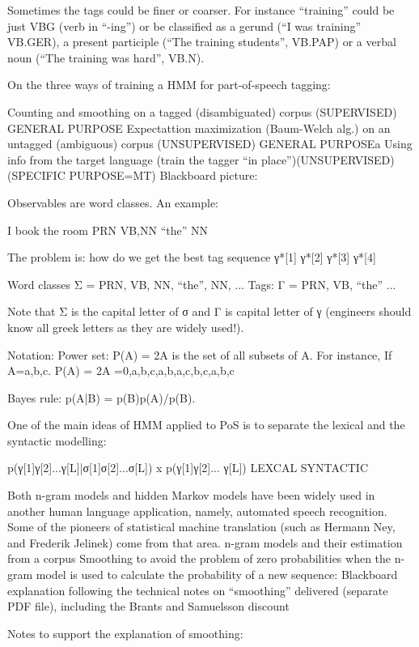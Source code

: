 Sometimes the tags could be finer or coarser. For instance “training” could be just VBG (verb in “-ing”) or be classified as a gerund (“I was training” VB.GER), a present participle (“The training students”, VB.PAP) or a verbal noun (“The training was hard”, VB.N).

On the three ways of training a HMM for part-of-speech tagging:

Counting and smoothing on a tagged (disambiguated) corpus (SUPERVISED) GENERAL PURPOSE
Expectattion maximization (Baum-Welch alg.) on an untagged (ambiguous) corpus (UNSUPERVISED) GENERAL PURPOSEa
Using info from the target language (train the tagger “in place”)(UNSUPERVISED) (SPECIFIC PURPOSE=MT)
Blackboard picture:


Observables are word classes. An example:

I book the room
{PRN} {VB,NN} “the” {NN}

The problem is: how do we get the best tag sequence γ*[1] γ*[2] γ*[3] γ*[4]

Word classes Σ = { {PRN}, {VB, NN}, “the”, {NN}, ...}
Tags: Γ = { PRN, VB, “the” ...}

Note that Σ is the capital letter of σ and Γ is capital letter of γ (engineers should know all greek letters as they are widely used!).

Notation: Power set: P(A) = 2A  is the set of all subsets of A. For instance, If A={a,b,c}. P(A) = 2A ={0,{a},{b},{c},{a,b},{a,c},{b,c},{a,b,c}}

Bayes rule: p(A|B) = p(B)p(A)/p(B).

One of the main ideas of HMM applied to PoS is to separate the lexical and the syntactic modelling:	
	 	
p(γ[1]γ[2]...γ[L]|σ[1]σ[2]...σ[L])	x	p(γ[1]γ[2]... γ[L])
{		LEXCAL	 }		{ SYNTACTIC }




Both n-gram models and hidden Markov models have been widely used in another human language  application, namely, automated speech recognition. Some of the pioneers of statistical machine translation (such as Hermann Ney, and Frederik Jelinek) come from that area.
n-gram models and their estimation from a corpus
Smoothing to avoid the problem of zero probabilities when the n-gram model is used to calculate the probability of a new sequence: Blackboard explanation following the technical notes on “smoothing” delivered (separate PDF file), including the Brants and Samuelsson discount

Notes to support the explanation of smoothing: 
	 	 	
